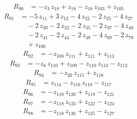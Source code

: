\begin{equation*}\begin{aligned}
R_{90}&=-z_{3}\,z_{18} +z_{18} -z_{18}\,z_{103} +z_{105}
\end{aligned}\end{equation*}
\begin{equation*}\begin{aligned}
R_{91}&=-5\,z_{11} +3\,z_{12} -4\,z_{22} -2\,z_{25} -4\,z_{27} \\
&\quad -2\,z_{30} -2\,z_{32} -2\,z_{35} -2\,z_{37} -4\,z_{40} \\
&\quad -2\,z_{41} -2\,z_{44} -2\,z_{48} -4\,z_{69} -2\,z_{70} \\
&\quad +z_{106}
\end{aligned}\end{equation*}
\begin{equation*}\begin{aligned}
R_{92}&=-z_{108}\,z_{111} +z_{111} +z_{113}
\end{aligned}\end{equation*}
\begin{equation*}\begin{aligned}
R_{93}&=-z_{6}\,z_{110} +z_{109} -z_{110}\,z_{113} -z_{112}
\end{aligned}\end{equation*}
\begin{equation*}\begin{aligned}
R_{94}&=-z_{20}\,z_{115} +z_{118}
\end{aligned}\end{equation*}
\begin{equation*}\begin{aligned}
R_{95}&=z_{114} -z_{116}\,z_{118} -z_{117}
\end{aligned}\end{equation*}
\begin{equation*}\begin{aligned}
R_{96}&=-z_{118}\,z_{120} +z_{119} -z_{121}
\end{aligned}\end{equation*}
\begin{equation*}\begin{aligned}
R_{97}&=-z_{118}\,z_{123} +z_{122} -z_{124}
\end{aligned}\end{equation*}
\begin{equation*}\begin{aligned}
R_{98}&=-z_{118}\,z_{126} +z_{125} -z_{127}
\end{aligned}\end{equation*}
